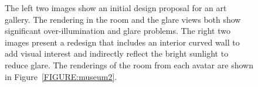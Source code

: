 \documentclass[10pt,twocolumn,letterpaper]{article}
\begin{document}
\begin{figure}[t]
\begin{center}
%
\vspace{-0.1in}
\end{center}
\caption{ The left two images show an initial design proposal for an
  art gallery.  The rendering in the room and the glare views both
  show significant over-illumination and glare problems.  The right
  two images present a redesign that includes an interior curved wall
  to add visual interest and indirectly reflect the bright sunlight to
  reduce glare. The renderings of the room from each avatar are shown
  in Figure~\ref{FIGURE:museum2}.}
%
%
\label{FIGURE:editing_model}
\end{figure}
\end{document}
